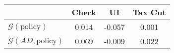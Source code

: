\begin{tabular}{@{}lccc@{}} 
\toprule 
                          & Check      & UI    & Tax Cut    \\  \midrule 
$\mathcal{G}(\text{policy})$ & 0.014  & -0.057  & 0.001     \\ 
$\mathcal{G}(AD,\text{policy})$ & 0.069  & -0.009  & 0.022     \\ 
\end{tabular}  
